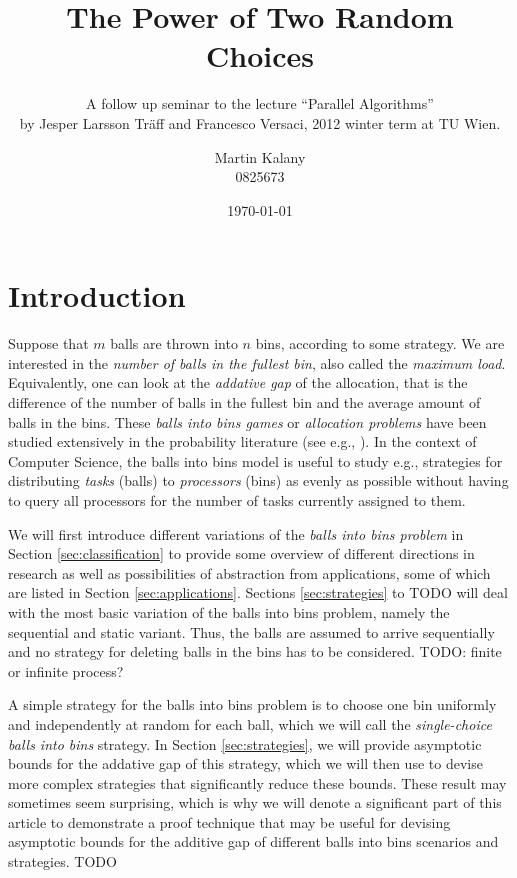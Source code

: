 \documentclass{acm_proc_article-sp}
\begin{document}
\title{The Power of Two Random Choices}
\subtitle{\large A follow up seminar to the lecture ``Parallel Algorithms''\\ by Jesper Larsson Tr\"aff and Francesco Versaci, 2012 winter term at TU Wien.}

\author{
\alignauthor
Martin Kalany\\
       0825673
}    
\date{\today}

\maketitle
\begin{abstract}

\end{abstract}


\section{Introduction}
\label{sec:intro}
Suppose that $m$ balls are thrown into $n$ bins, according to some strategy. We are interested in the \emph{number of balls in the fullest bin}, also called the \emph{maximum load}. Equivalently, one can look at the \emph{addative gap} of the allocation, that is the difference of the number of balls in the fullest bin and the average amount of balls in the bins. These \emph{balls into bins games} or \emph{allocation problems} have been studied extensively in the probability literature (see e.g., \cite{JK77}). In the context of Computer Science, the balls into bins model is useful to study e.g., strategies for distributing \emph{tasks} (balls) to \emph{processors} (bins) as evenly as possible without having to query all processors for the number of tasks currently assigned to them.

We will first introduce different variations of the \emph{balls into bins problem} in Section \ref{sec:classification} to provide some overview of different directions in research as well as possibilities of abstraction from applications, some of which are listed in Section \ref{sec:applications}. Sections \ref{sec:strategies} to TODO will deal with the most basic variation of the balls into bins problem, namely the sequential and static variant. Thus, the balls are assumed to arrive sequentially and no strategy for deleting balls in the bins has to be considered. TODO: finite or infinite process?

A simple strategy for the balls into bins problem is to choose one bin uniformly and independently at random for each ball, which we will call the \emph{single-choice balls into bins} strategy. In Section \ref{sec:strategies}, we will provide asymptotic bounds for the addative gap of this strategy, which we will then use to devise more complex strategies that significantly reduce these bounds. These result may sometimes seem surprising, which is why we will denote a significant part of this article to demonstrate a proof technique that may be useful for devising asymptotic bounds for the additive gap of different balls into bins scenarios and strategies. TODO
\end{document}
